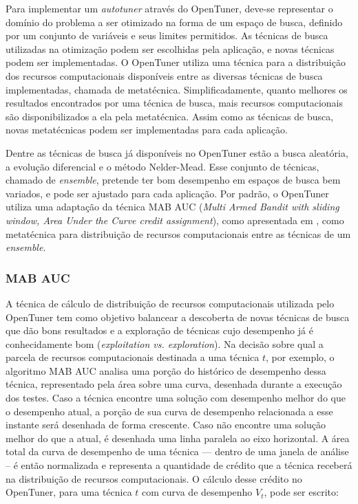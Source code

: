 \documentclass[a4paper, 11pt]{article}
\begin{document}
Para implementar um \emph{autotuner} através do OpenTuner, deve-se representar
o domínio do problema a ser otimizado na forma de um espaço de busca, definido 
por um conjunto de variáveis e seus limites permitidos. As técnicas de busca 
utilizadas na otimização podem ser escolhidas pela aplicação, e novas técnicas
podem ser implementadas. O OpenTuner utiliza uma técnica para a 
distribuição dos recursos computacionais disponíveis entre as 
diversas técnicas de busca implementadas, chamada de metatécnica.
Simplificadamente, quanto melhores os resultados encontrados por uma técnica de
busca, mais recursos computacionais são disponibilizados a ela pela 
metatécnica. Assim como as técnicas de busca, novas metatécnicas podem ser 
implementadas para cada aplicação.

Dentre as técnicas de busca já disponíveis no OpenTuner estão a busca 
aleatória, a evolução diferencial e o método Nelder-Mead. Esse conjunto
de técnicas, chamado de \emph{ensemble}, pretende ter bom desempenho em espaços
de busca bem variados, e pode ser ajustado para cada aplicação. Por padrão, o 
OpenTuner utiliza uma adaptação da técnica MAB AUC (\emph{Multi Armed Bandit 
with sliding window, Area Under the Curve credit assignment}), como apresentada
em \citet{pacula2012bandit}, como metatécnica para distribuição de recursos 
computacionais entre as técnicas de um \emph{ensemble}.

\subsubsection{MAB AUC}

A técnica de cálculo de distribuição de recursos computacionais utilizada
pelo OpenTuner tem como objetivo balancear a descoberta de novas técnicas
de busca que dão bons resultados e a exploração de técnicas cujo desempenho
já é conhecidamente bom (\emph{exploitation vs. exploration}). Na decisão sobre
qual a parcela de recursos computacionais destinada a uma técnica $t$, por
exemplo, o algoritmo MAB AUC analisa uma porção do histórico de desempenho 
dessa técnica, representado pela área sobre uma curva, desenhada durante a
execução dos testes. Caso a técnica encontre uma solução com desempenho melhor
do que o desempenho atual, a porção de sua curva de desempenho relacionada a
esse instante será desenhada de forma crescente. Caso não encontre uma solução
melhor do que a atual, é desenhada uma linha paralela ao eixo horizontal. A
área total da curva de desempenho de uma técnica --- dentro de uma janela de
análise -- é então normalizada e representa a quantidade de crédito que a 
técnica receberá na distribuição de recursos computacionais. O cálculo desse 
crédito no OpenTuner, para uma técnica $t$ com curva de desempenho $V_t$, pode
ser escrito:
\end{document}
